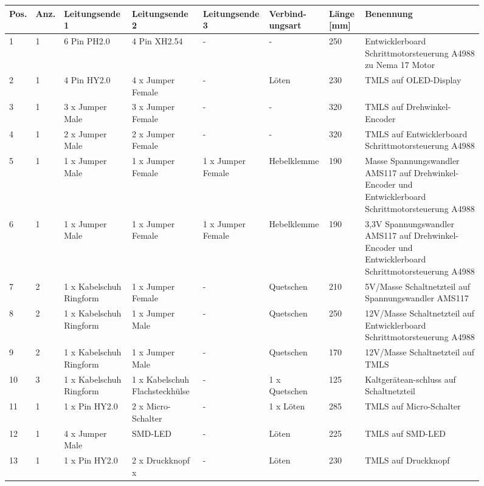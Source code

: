 \begin{figure}[H]
	\begin{center}
		\fontsize{8}{10}\selectfont
		\begin{tabularx}{\textwidth}{|p{0.5cm}|p{0.5cm}|p{2.0cm}|p{2.0cm}|p{2.0cm}|X|p{0.7cm}|X|} 
			\hline 
			\textbf{Pos.} &  \textbf{Anz.} &  \textbf{Leitungsende 1} &  \textbf{Leitungsende 2} &  \textbf{Leitungsende 3} & \textbf{Verbind-ungsart} &  \textbf{Länge [mm]} &  \textbf{Benennung} \\ \hline
			1 & 1 & 6 Pin PH2.0 & 4 Pin XH2.54 & - & - & 250 & Entwicklerboard Schrittmotorsteuerung A4988 zu Nema 17 Motor \\ \hline
			2 & 1 & 4 Pin HY2.0 & 4 x Jumper Female & - & Löten & 230 & TMLS auf OLED-Display \\ \hline
			3 & 1 & 3 x Jumper Male & 3 x Jumper Female & - & - & 320 & TMLS auf Drehwinkel-Encoder \\ \hline
			4 & 1 & 2 x Jumper Male & 2 x Jumper Female & - & - & 320 & TMLS auf Entwicklerboard Schrittmotorsteuerung A4988 \\ \hline
			5 & 1 & 1 x Jumper Male & 1 x Jumper Female & 1 x Jumper Female & Hebelklemme & 190 & Masse Spannungswandler AMS117 auf Drehwinkel-Encoder und Entwicklerboard Schrittmotorsteuerung A4988 \\ \hline
			6 & 1 & 1 x Jumper Male & 1 x Jumper Female & 1 x Jumper Female & Hebelklemme & 190 & 3,3V Spannungswandler AMS117 auf Drehwinkel-Encoder und Entwicklerboard Schrittmotorsteuerung A4988 \\ \hline
			7 & 2 & 1 x Kabelschuh Ringform & 1 x Jumper Female &  - & Quetschen & 210 & 5V/Masse Schaltnetzteil auf Spannungswandler AMS117  \\ \hline
			8 & 2 & 1 x Kabelschuh Ringform & 1 x Jumper Male &  - & Quetschen & 250 & 12V/Masse Schaltnetzteil auf Entwicklerboard Schrittmotorsteuerung A4988  \\ \hline
			9 & 2 & 1 x Kabelschuh Ringform & 1 x Jumper Male &  - & Quetschen & 170 & 12V/Masse Schaltnetzteil auf TMLS  \\ \hline
			10 & 3 & 1 x Kabelschuh Ringform & 1 x Kabelschuh Flachsteckhülse & - & 1 x Quetschen & 125 & Kaltgerätean-schluss auf Schaltnetzteil  \\ \hline
			11 & 1 & 1 x Pin HY2.0 & 2 x Micro-Schalter & - & 1 x Löten & 285 & TMLS auf Micro-Schalter  \\ \hline
			12 & 1 & 4 x Jumper Male & SMD-LED & - & Löten & 225 & TMLS auf SMD-LED  \\ \hline
			13 & 1 & 1 x Pin HY2.0 & 2 x Druckknopf x & - & Löten & 230 & TMLS auf Druckknopf  \\ \hline
			
		\end{tabularx}
			\label{Leittab}
	\end{center}
\end{figure}

